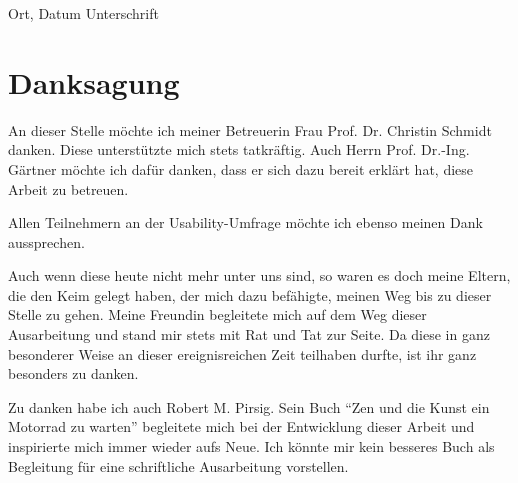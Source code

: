 \vspace{4cm}

\hspace{2cm} Ort, Datum \hfill Unterschrift \hspace{2cm}


\newpage

\section*{Danksagung}

An dieser Stelle möchte ich  meiner Betreuerin Frau Prof. Dr. Christin Schmidt danken. Diese unterstützte mich stets tatkräftig. Auch Herrn Prof. Dr.-Ing. Gärtner möchte ich dafür danken, dass er sich dazu bereit erklärt hat, diese Arbeit zu betreuen.

Allen Teilnehmern an der Usability-Umfrage möchte ich ebenso meinen Dank aussprechen.

Auch wenn diese heute nicht mehr unter uns sind, so waren es doch meine Eltern, die den Keim gelegt haben, der mich dazu befähigte, meinen Weg bis zu dieser Stelle zu gehen. Meine Freundin begleitete mich auf dem Weg dieser Ausarbeitung und stand mir stets mit Rat und Tat zur Seite. Da diese in ganz besonderer Weise an dieser ereignisreichen Zeit teilhaben durfte, ist ihr ganz besonders zu danken.

Zu danken habe ich auch Robert M. Pirsig. Sein Buch "`Zen und die Kunst ein Motorrad zu warten"' begleitete mich bei der Entwicklung dieser Arbeit und inspirierte mich immer wieder aufs Neue. Ich könnte mir kein besseres Buch als Begleitung für eine schriftliche Ausarbeitung vorstellen.
